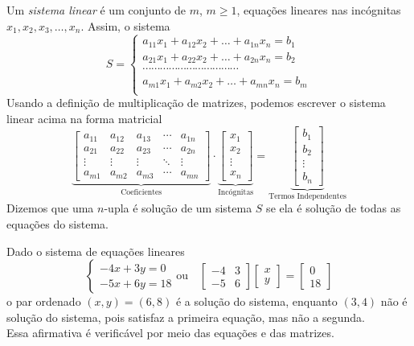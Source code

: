 \begin{df}
Um \emph{sistema linear} é um conjunto de $m$, $m\ge 1$, equações lineares nas incógnitas $x_1,x_2,x_3,\dots,x_n$. Assim, o sistema
\[S=\begin{cases}
a_{11}x_1+a_{12}x_2+\dots+a_{1n}x_n=b_1 \\
a_{21}x_1+a_{22}x_2+\dots+a_{2n}x_n=b_2 \\
\cdots \cdots \cdots \cdots \cdots \cdots \cdots \cdots \cdots\cdots\cdots\\
a_{m1}x_1+a_{m2}x_2+\dots+a_{mn}x_n=b_m\\
\end{cases}\]
Usando a definição de multiplicação de matrizes, podemos escrever o sistema linear acima na forma matricial
\[\underbrace{\begin{bmatrix}
a_{11} & a_{12} & a_{13} & \cdots & a_{1n} \\ 
a_{21} & a_{22} & a_{23} & \cdots & a_{2n} \\ 
\vdots & \vdots & \vdots & \ddots & \vdots \\
a_{m1} & a_{m2} & a_{m3} & \cdots & a_{mn} 
\end{bmatrix}}_{\text{Coeficientes}} \cdot \underbrace{\begin{bmatrix}
x_1 \\
x_2 \\
\vdots \\
x_n
\end{bmatrix}}_{\text{Incógnitas}}=\underbrace{\begin{bmatrix}
b_1 \\
b_2 \\
\vdots \\ 
b_n 
\end{bmatrix}}_{\text{Termos Independentes}}\]
Dizemos que uma $n$-upla é solução de um sistema $S$ se ela é solução de todas as equações do sistema.
\end{df}
\begin{exemplo} Dado o sistema de equações lineares
\[\begin{cases}
-4x+3y=0\\
-5x+6y=18
\end{cases} \text{ou} \quad  \begin{bmatrix}
-4 & 3 \\ -5 & 6
\end{bmatrix}\begin{bmatrix}
x \\ y
\end{bmatrix}=\begin{bmatrix}
0 \\ 18
\end{bmatrix}\] o par ordenado $(x,y)=(6,8)$ é a solução do sistema, enquanto $(3,4)$ não é solução do sistema, pois satisfaz a primeira equação, mas não a segunda. \\
Essa afirmativa é verificável por meio das equações e das matrizes.
\end{exemplo}

